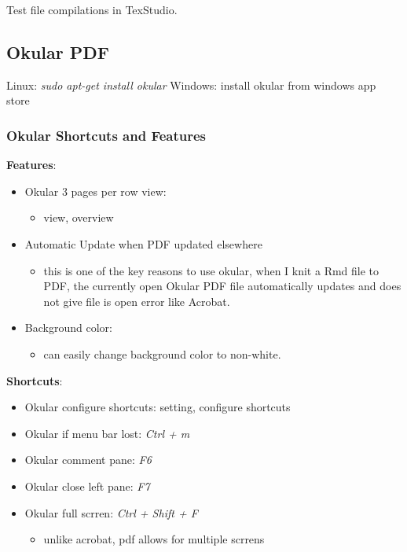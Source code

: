 \documentclass[]{article}
\providecommand{\tightlist}{%
  \setlength{\itemsep}{0pt}\setlength{\parskip}{0pt}}
\begin{document}
Test file compilations in TexStudio.

\hypertarget{okular-pdf}{%
\subsection{Okular PDF}\label{okular-pdf}}

Linux: \emph{sudo apt-get install okular} Windows: install okular from
windows app store

\hypertarget{okular-shortcuts-and-features}{%
\subsubsection{Okular Shortcuts and
Features}\label{okular-shortcuts-and-features}}

\textbf{Features}:

\begin{itemize}
\tightlist
\item
  Okular 3 pages per row view:

  \begin{itemize}
  \tightlist
  \item
    view, overview
  \end{itemize}
\item
  Automatic Update when PDF updated elsewhere

  \begin{itemize}
  \tightlist
  \item
    this is one of the key reasons to use okular, when I knit a Rmd file
    to PDF, the currently open Okular PDF file automatically updates and
    does not give file is open error like Acrobat.
  \end{itemize}
\item
  Background color:

  \begin{itemize}
  \tightlist
  \item
    can easily change background color to non-white.
  \end{itemize}
\end{itemize}

\textbf{Shortcuts}:

\begin{itemize}
\tightlist
\item
  Okular configure shortcuts: setting, configure shortcuts
\item
  Okular if menu bar lost: \emph{Ctrl + m}
\item
  Okular comment pane: \emph{F6}
\item
  Okular close left pane: \emph{F7}
\item
  Okular full scrren: \emph{Ctrl + Shift + F}

  \begin{itemize}
  \tightlist
  \item
    unlike acrobat, pdf allows for multiple scrrens
  \end{itemize}
\end{itemize}
\end{document}
